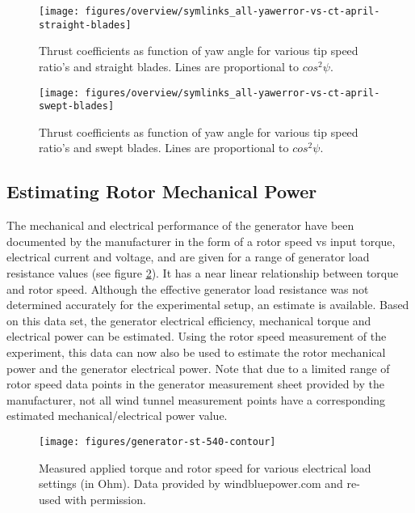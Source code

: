\documentclass[a4paper]{jpconf}
\begin{document}

\begin{figure}[h]
\begin{minipage}{17pc}
\texttt{[image: figures/overview/symlinks\_all-yawerror-vs-ct-april-straight-blades]}
\caption{\label{ct-vs-yawerror-straight} Thrust coefficients as function of yaw angle for various tip speed ratio's and straight blades. Lines are proportional to $cos^2 \psi$.}
\end{minipage}\hspace{3pc}%
\begin{minipage}{17pc}
\texttt{[image: figures/overview/symlinks\_all-yawerror-vs-ct-april-swept-blades]}
\caption{\label{ct-vs-yawerror-swept} Thrust coefficients as function of yaw angle for various tip speed ratio's and swept blades. Lines are proportional to $cos^2 \psi$.}
\end{minipage} 
\end{figure}


\subsection{Estimating Rotor Mechanical Power}

The mechanical and electrical performance of the generator have been documented by the manufacturer in the form of a rotor speed vs input torque, electrical current and voltage, and are given for a range of generator load resistance values (see figure \ref{rpm2torque-windbluepower}). It has a near linear relationship between torque and rotor speed. Although the effective generator load resistance was not determined accurately for the experimental setup, an estimate is available. Based on this data set, the generator electrical efficiency, mechanical torque and electrical power can be estimated. Using the rotor speed measurement of the experiment, this data can now also be used to estimate the rotor mechanical power and the generator electrical power. Note that due to a limited range of rotor speed data points in the generator measurement sheet provided by the manufacturer, not all wind tunnel measurement points have a corresponding estimated mechanical/electrical power value.

\begin{figure}[h]
\centering
\begin{minipage}{\textwidth}
\centering
\texttt{[image: figures/generator-st-540-contour]}
\caption{\label{rpm2torque-windbluepower} Measured applied torque and rotor speed for various electrical load settings (in Ohm). Data provided by windbluepower.com and re-used with permission.}
\end{minipage} 
\end{figure}
\end{document}
